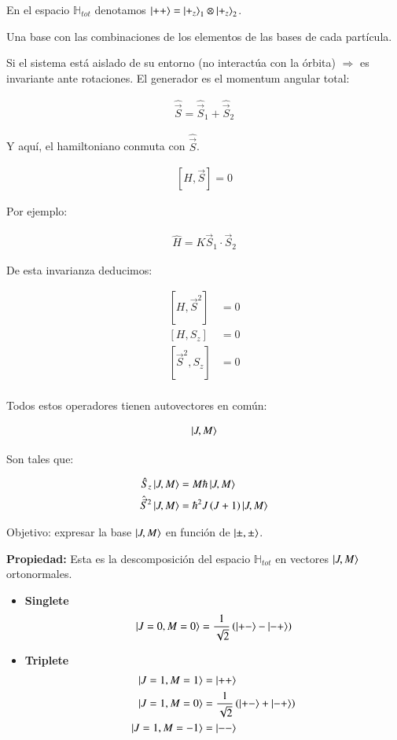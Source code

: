 En el espacio $\mathbb{H}_{tot }$ denotamos $\ket{++}=\ket{+_z}_1\otimes\ket{+_z}_2$.

Una base con las combinaciones de los elementos de las bases de cada partícula.

Si el sistema está aislado de su entorno (no interactúa con la órbita) $\Rightarrow$ es invariante ante rotaciones. El generador es el momentum angular total:

\begin{align*}
    \hat{\vec{S}}=\hat{\vec{S}}_1+\hat{\vec{S}}_2
\end{align*}


Y aquí, el hamiltoniano conmuta con $\hat{\vec{S}}$.

\begin{align*}
    \left[H,\vec{S}\right]=0
\end{align*}

Por ejemplo:

\begin{align*}
    \hat{H}=K\vec{S}_1\cdot \vec{S}_2
\end{align*}

De esta invarianza deducimos:

\begin{align*}
    \left[H,\vec{S}^2\right]&=0\\
    \left[H,S_z\right]&=0\\
    \left[\vec{S}^2,S_z\right]&=0\\
\end{align*}

Todos estos operadores tienen autovectores en común:

\begin{align*}
    \ket{J,M}
\end{align*}

Son tales que:

\begin{align*}
    \hat{S}_z\ket{J,M}&=M\hbar\ket{J,M}\\
    \hat{\vec{S}}^2\ket{J,M}&=\hbar^2 J\left(J+1\right)\ket{J,M}\\
\end{align*}

Objetivo: expresar la base $\ket{J,M}$ en función de $\ket{\pm,\pm}$.

\textbf{Propiedad:} Esta es la descomposición del espacio $\mathbb{H}_{tot}$ en vectores $\ket{J,M}$ ortonormales.

\begin{itemize}
    \item \textbf{Singlete}
    $$\ket{J=0,M=0}=\frac{1}{\sqrt{2}}\left(\ket{+-}-\ket{-+}\right)$$
    \item \textbf{Triplete}
    \begin{align*}
        \ket{J=1,M=1}&=\ket{++}\\
        \ket{J=1,M=0}&=\frac{1}{\sqrt{2}}\left(\ket{+-}+\ket{-+}\right)\\
        \ket{J=1,M=-1}&=\ket{--}\\
    \end{align*}
\end{itemize}

